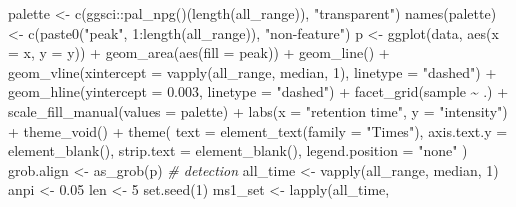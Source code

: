 \documentclass[
]{article}
\newenvironment{Shaded}{\begin{snugshade}}{\end{snugshade}}
\newcommand{\AttributeTok}[1]{\textcolor[rgb]{0.77,0.63,0.00}{#1}}
\newcommand{\CommentTok}[1]{\textcolor[rgb]{0.56,0.35,0.01}{\textit{#1}}}
\newcommand{\DecValTok}[1]{\textcolor[rgb]{0.00,0.00,0.81}{#1}}
\newcommand{\FloatTok}[1]{\textcolor[rgb]{0.00,0.00,0.81}{#1}}
\newcommand{\FunctionTok}[1]{\textcolor[rgb]{0.00,0.00,0.00}{#1}}
\newcommand{\NormalTok}[1]{#1}
\newcommand{\OtherTok}[1]{\textcolor[rgb]{0.56,0.35,0.01}{#1}}
\newcommand{\SpecialCharTok}[1]{\textcolor[rgb]{0.00,0.00,0.00}{#1}}
\newcommand{\StringTok}[1]{\textcolor[rgb]{0.31,0.60,0.02}{#1}}
\begin{document}
\begin{Shaded}
\begin{Highlighting}[]
\NormalTok{palette }\OtherTok{\textless{}{-}} \FunctionTok{c}\NormalTok{(ggsci}\SpecialCharTok{::}\FunctionTok{pal\_npg}\NormalTok{()(}\FunctionTok{length}\NormalTok{(all\_range)), }\StringTok{"transparent"}\NormalTok{)}
\FunctionTok{names}\NormalTok{(palette) }\OtherTok{\textless{}{-}} \FunctionTok{c}\NormalTok{(}\FunctionTok{paste0}\NormalTok{(}\StringTok{"peak"}\NormalTok{, }\DecValTok{1}\SpecialCharTok{:}\FunctionTok{length}\NormalTok{(all\_range)), }\StringTok{"non{-}feature"}\NormalTok{)}
\NormalTok{p }\OtherTok{\textless{}{-}} \FunctionTok{ggplot}\NormalTok{(data, }\FunctionTok{aes}\NormalTok{(}\AttributeTok{x =}\NormalTok{ x, }\AttributeTok{y =}\NormalTok{ y)) }\SpecialCharTok{+}
  \FunctionTok{geom\_area}\NormalTok{(}\FunctionTok{aes}\NormalTok{(}\AttributeTok{fill =}\NormalTok{ peak)) }\SpecialCharTok{+}
  \FunctionTok{geom\_line}\NormalTok{() }\SpecialCharTok{+}
  \FunctionTok{geom\_vline}\NormalTok{(}\AttributeTok{xintercept =} \FunctionTok{vapply}\NormalTok{(all\_range, median, }\DecValTok{1}\NormalTok{), }\AttributeTok{linetype =} \StringTok{"dashed"}\NormalTok{) }\SpecialCharTok{+}
  \FunctionTok{geom\_hline}\NormalTok{(}\AttributeTok{yintercept =} \FloatTok{0.003}\NormalTok{, }\AttributeTok{linetype =} \StringTok{"dashed"}\NormalTok{) }\SpecialCharTok{+}
  \FunctionTok{facet\_grid}\NormalTok{(sample }\SpecialCharTok{\textasciitilde{}}\NormalTok{ .) }\SpecialCharTok{+}
  \FunctionTok{scale\_fill\_manual}\NormalTok{(}\AttributeTok{values =}\NormalTok{ palette) }\SpecialCharTok{+}
  \FunctionTok{labs}\NormalTok{(}\AttributeTok{x =} \StringTok{"retention time"}\NormalTok{, }\AttributeTok{y =} \StringTok{"intensity"}\NormalTok{) }\SpecialCharTok{+}
  \FunctionTok{theme\_void}\NormalTok{() }\SpecialCharTok{+}
  \FunctionTok{theme}\NormalTok{(}
    \AttributeTok{text =} \FunctionTok{element\_text}\NormalTok{(}\AttributeTok{family =} \StringTok{"Times"}\NormalTok{), }\AttributeTok{axis.text.y =} \FunctionTok{element\_blank}\NormalTok{(),}
    \AttributeTok{strip.text =} \FunctionTok{element\_blank}\NormalTok{(),}
    \AttributeTok{legend.position =} \StringTok{"none"}
\NormalTok{  )}
\NormalTok{grob.align }\OtherTok{\textless{}{-}} \FunctionTok{as\_grob}\NormalTok{(p)}
\CommentTok{\# detection}
\NormalTok{all\_time }\OtherTok{\textless{}{-}} \FunctionTok{vapply}\NormalTok{(all\_range, median, }\DecValTok{1}\NormalTok{)}
\NormalTok{anpi }\OtherTok{\textless{}{-}} \FloatTok{0.05}
\NormalTok{len }\OtherTok{\textless{}{-}} \DecValTok{5}
\FunctionTok{set.seed}\NormalTok{(}\DecValTok{1}\NormalTok{)}
\NormalTok{ms1\_set }\OtherTok{\textless{}{-}} \FunctionTok{lapply}\NormalTok{(all\_time,}

\end{Highlighting}
\end{Shaded}
\end{document}
